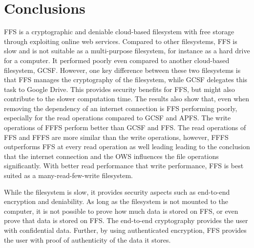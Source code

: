 
\section{Conclusions}
\label{sec:conclusions}
  


FFS is a cryptographic and deniable cloud-based filesystem with free storage through exploiting online web services. Compared to other filesystems, FFS is slow and is not suitable as a multi-purpose filesystem, for instance as a hard drive for a computer. It performed poorly even compared to another cloud-based filesystem, GCSF. However, one key difference between these two filesystems is that FFS manages the cryptography of the filesystem, while GCSF delegates this task to Google Drive. This provides security benefits for FFS, but might also contribute to the slower computation time. The results also show that, even when removing the dependency of an internet connection is FFS performing poorly, especially for the read operations compared to GCSF and APFS. The write operations of FFFS perform better than GCSF and FFS. The read operations of FFS and FFFS are more similar than the write operations, however, FFFS outperforms FFS at every read operation as well leading leading to the conclusion that the internet connection and the OWS influences the file operations significantly. With better read performance that write performance, FFS is best suited as a many-read-few-write filesystem.

While the filesystem is slow, it provides security aspects such as end-to-end encryption and deniability. As long as the filesystem is not mounted to the computer, it is not possible to prove how much data is stored on FFS, or even prove that data is stored on FFS. The end-to-end cryptography provides the user with confidential data. Further, by using authenticated encryption, FFS provides the user with proof of authenticity of the data it stores. 